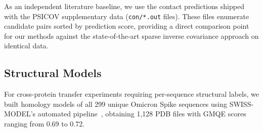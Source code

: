 As an independent literature baseline, we use the contact predictions shipped
with the PSICOV supplementary data (\texttt{con/*.out} files).  These files
enumerate candidate pairs sorted by prediction score, providing a direct
comparison point for our methods against the state-of-the-art sparse inverse
covariance approach on identical data.

\subsection{Structural Models}
For cross-protein transfer experiments requiring per-sequence structural
labels, we built homology models of all 299 unique Omicron Spike sequences
using SWISS-MODEL's automated pipeline~\cite{waterhouse2018}, obtaining
1{,}128 PDB files with GMQE scores ranging from 0.69 to 0.72.
